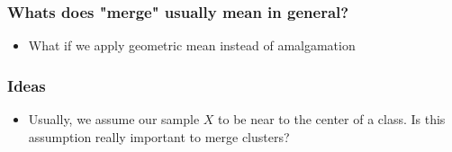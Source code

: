 \begin{frame}
\frametitle{Whats does "merge" usually mean  in general?}


\begin{itemize}
\item What if we apply geometric mean instead of amalgamation
\end{itemize}
\end{frame}

\begin{frame}
\frametitle{Ideas}
\begin{itemize}
\item Usually, we assume our sample $X$ to be near to the center of a class. Is this assumption really important to merge clusters?
\end{itemize}
\end{frame}